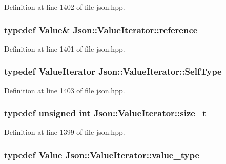 Definition at line 1402 of file json.\-hpp.

\hypertarget{class_json_1_1_value_iterator_ae87929b4567aa00372cf602c43b57160}{
\subsubsection[{reference}]{\setlength{\rightskip}{0pt plus 5cm}typedef {\bf Value}\& {\bf Json\-::\-Value\-Iterator\-::reference}}}\label{class_json_1_1_value_iterator_ae87929b4567aa00372cf602c43b57160}


Definition at line 1401 of file json.\-hpp.

\hypertarget{class_json_1_1_value_iterator_a23357670fdad61792670d86f62db7e16}{
\subsubsection[{Self\-Type}]{\setlength{\rightskip}{0pt plus 5cm}typedef {\bf Value\-Iterator} {\bf Json\-::\-Value\-Iterator\-::\-Self\-Type}}}\label{class_json_1_1_value_iterator_a23357670fdad61792670d86f62db7e16}


Definition at line 1403 of file json.\-hpp.

\hypertarget{class_json_1_1_value_iterator_a308b8932ffc83eaa9d12dadd5c11a7dd}{
\subsubsection[{size\-\_\-t}]{\setlength{\rightskip}{0pt plus 5cm}typedef unsigned int {\bf Json\-::\-Value\-Iterator\-::size\-\_\-t}}}\label{class_json_1_1_value_iterator_a308b8932ffc83eaa9d12dadd5c11a7dd}


Definition at line 1399 of file json.\-hpp.

\hypertarget{class_json_1_1_value_iterator_a2c5ba7be611f05546530c8a88b2d2e37}{
\subsubsection[{value\-\_\-type}]{\setlength{\rightskip}{0pt plus 5cm}typedef {\bf Value} {\bf Json\-::\-Value\-Iterator\-::value\-\_\-type}}}\label{class_json_1_1_value_iterator_a2c5ba7be611f05546530c8a88b2d2e37}


